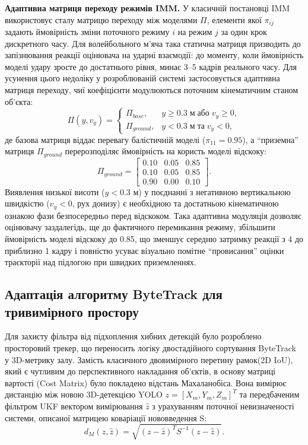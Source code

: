 \textbf{Адаптивна матриця переходу режимів \gls{IMM}.} У класичній постановці IMM~\cite{blom_barshalom}
використовує сталу матрицю переходу між моделями $\Pi$, елементи якої $\pi_{ij}$ задають
ймовірність зміни поточного режиму $i$ на режим $j$ за один крок дискретного часу. Для
волейбольного м'яча така статична матриця призводить до запізнювання реакції оцінювача
на ударні взаємодії: до моменту, коли ймовірність моделі удару зросте до достатнього
рівня, минає 3--5 кадрів реального часу. Для усунення цього недоліку у розроблюваній
системі застосовується адаптивна матриця переходу, чиї коефіцієнти модулюються поточним
кінематичним станом об'єкта:
\begin{equation}\Pi(y, v_y) = \begin{cases}
\Pi_{base}, & y \geq 0.3 \;\text{м} \;\text{або}\; v_y \geq 0, \\
\Pi_{ground}, & y < 0.3 \;\text{м} \;\text{та}\; v_y < 0,
\end{cases}\end{equation}
де базова матриця віддає перевагу балістичній моделі ($\pi_{11} = 0.95$), а ``приземна''
матриця $\Pi_{ground}$ перерозподіляє ймовірність на користь моделі відскоку:
\begin{equation}\Pi_{ground} = \begin{bmatrix}
0.10 & 0.05 & 0.85 \\
0.10 & 0.05 & 0.85 \\
0.90 & 0.00 & 0.10
\end{bmatrix}.\end{equation}
Виявлення низької висоти ($y < 0.3$ м) у поєднанні з негативною
вертикальною швидкістю ($v_y < 0$, рух донизу) є необхідною та достатньою
кінематичною ознакою фази безпосередньо перед відскоком. Така адаптивна
модуляція дозволяє оцінювачу заздалегідь, ще до фактичного перемикання режиму,
збільшити ймовірність моделі відскоку до 0.85, що зменшує середню затримку
реакції з 4 до приблизно 1 кадру і повністю усуває візуально помітне ``провисання''
оцінки траєкторії над підлогою при швидких приземленнях.

\subsection{Адаптація алгоритму ByteTrack для тривимірного простору}

Для захисту фільтра від підхоплення хибних детекцій було розроблено
просторовий трекер, що переносить логіку двостадійного сортування
ByteTrack~\cite{zhang_bytetrack,roboflow_bytetrack} у 3D-метрику залу. Замість класичного двовимірного перетину
рамок(2D \gls{IoU}), який є чутливим до перспективного накладання об'єктів, в
основу матриці вартості (Cost Matrix) було покладено відстань
Махаланобіса. Вона вимірює дистанцію між новою 3D-детекцією \gls{YOLO} $z =
[X_m, Y_m, Z_m]^T$ та передбаченим фільтром \gls{UKF} вектором вимірювання
$\hat{z}$ з урахуванням поточної невизначеності системи, описаної матрицею
коваріації нововведення S:
\begin{equation}d_M(z, \hat{z}) = \sqrt{(z - \hat{z})^T S^{-1} (z - \hat{z})}.\end{equation}

